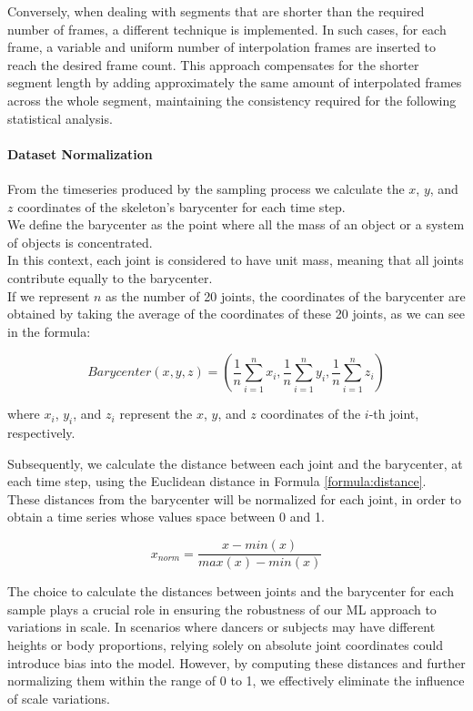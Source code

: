 Conversely, when dealing with segments that are shorter than the required number of frames, a different technique is implemented.
In such cases, for each frame, a variable and uniform number of interpolation frames are inserted to reach the desired frame count. 
This approach compensates for the shorter segment length by adding approximately the same amount of interpolated frames across the whole segment, maintaining the consistency required for the following statistical analysis.


\paragraph{Dataset Normalization}
From the timeseries produced by the sampling process we calculate the $x$, $y$, and $z$ coordinates of the skeleton's barycenter for each time step. \\
We define the barycenter as the point where all the mass of an object or a system of objects is concentrated. \\
In this context, each joint is considered to have unit mass, meaning that all joints contribute equally to the barycenter. \\
If we represent $n$ as the number of 20 joints, the coordinates of the barycenter are obtained by taking the average of the coordinates of these 20 joints, as we can see in the formula:

\begin{equation}
    Barycenter (x, y, z) = \left(\frac{1}{n} \sum_{i=1}^{n} x_i, \frac{1}{n} \sum_{i=1}^{n} y_i, \frac{1}{n} \sum_{i=1}^{n} z_i\right)
    \label{formula:baricentro}
\end{equation}
    
where $x_i$, $y_i$, and $z_i$ represent the $x$, $y$, and $z$ coordinates of the $i$-th joint, respectively.

Subsequently, we calculate the distance between each joint and the barycenter, at each time step, using the Euclidean distance in Formula \ref{formula:distance}. \\
These distances from the barycenter will be normalized for each joint, in order to obtain a time series whose values space between 0 and 1.

\begin{equation}
    x_{norm} = \frac{{x - min(x)}}{{max(x) - min(x)}}
    \label{formula:normalization}
\end{equation}
    
The choice to calculate the distances between joints and the barycenter for each sample plays a crucial role in ensuring the robustness of our ML approach to variations in scale.
In scenarios where dancers or subjects may have different heights or body proportions, relying solely on absolute joint coordinates could introduce bias into the model.
However, by computing these distances and further normalizing them within the range of 0 to 1, we effectively eliminate the influence of scale variations.

